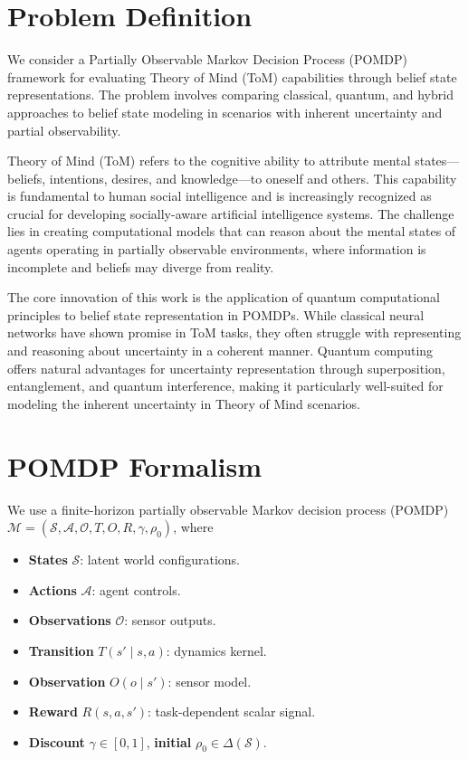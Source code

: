 \documentclass[11pt]{article}
\begin{document}
\section{Problem Definition}

We consider a Partially Observable Markov Decision Process (POMDP) framework for evaluating Theory of Mind (ToM) capabilities through belief state representations. The problem involves comparing classical, quantum, and hybrid approaches to belief state modeling in scenarios with inherent uncertainty and partial observability.

Theory of Mind (ToM) refers to the cognitive ability to attribute mental states—beliefs, intentions, desires, and knowledge—to oneself and others. This capability is fundamental to human social intelligence and is increasingly recognized as crucial for developing socially-aware artificial intelligence systems. The challenge lies in creating computational models that can reason about the mental states of agents operating in partially observable environments, where information is incomplete and beliefs may diverge from reality.

The core innovation of this work is the application of quantum computational principles to belief state representation in POMDPs. While classical neural networks have shown promise in ToM tasks, they often struggle with representing and reasoning about uncertainty in a coherent manner. Quantum computing offers natural advantages for uncertainty representation through superposition, entanglement, and quantum interference, making it particularly well-suited for modeling the inherent uncertainty in Theory of Mind scenarios.

\section{POMDP Formalism}

We use a finite-horizon partially observable Markov decision process (POMDP)
\(\mathcal{M} = (\mathcal{S}, \mathcal{A}, \mathcal{O}, T, O, R, \gamma, \rho_0)\), where
\begin{itemize}
  \item \textbf{States} \(\mathcal{S}\): latent world configurations.
  \item \textbf{Actions} \(\mathcal{A}\): agent controls.
  \item \textbf{Observations} \(\mathcal{O}\): sensor outputs.
  \item \textbf{Transition} \(T(s'\mid s,a)\): dynamics kernel.
  \item \textbf{Observation} \(O(o\mid s')\): sensor model.
  \item \textbf{Reward} \(R(s,a,s')\): task-dependent scalar signal.
  \item \textbf{Discount} \(\gamma\in[0,1]\), \textbf{initial} \(\rho_0\in\Delta(\mathcal{S})\).
\end{itemize}
\end{document}
